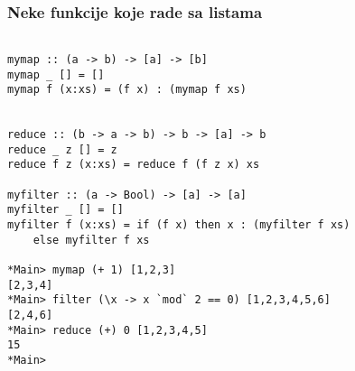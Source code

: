 \documentclass{beamer}
\begin{document}
\begin{frame}[fragile]
\frametitle{Neke funkcije koje rade sa listama}
\begin{lstlisting}

mymap :: (a -> b) -> [a] -> [b]
mymap _ [] = []
mymap f (x:xs) = (f x) : (mymap f xs)


reduce :: (b -> a -> b) -> b -> [a] -> b 
reduce _ z [] = z 
reduce f z (x:xs) = reduce f (f z x) xs

myfilter :: (a -> Bool) -> [a] -> [a]
myfilter _ [] = [] 
myfilter f (x:xs) = if (f x) then x : (myfilter f xs) 
	else myfilter f xs

*Main> mymap (+ 1) [1,2,3]
[2,3,4]
*Main> filter (\x -> x `mod` 2 == 0) [1,2,3,4,5,6]
[2,4,6]
*Main> reduce (+) 0 [1,2,3,4,5]
15
*Main> 

\end{lstlisting}
\end{frame}
\end{document}

